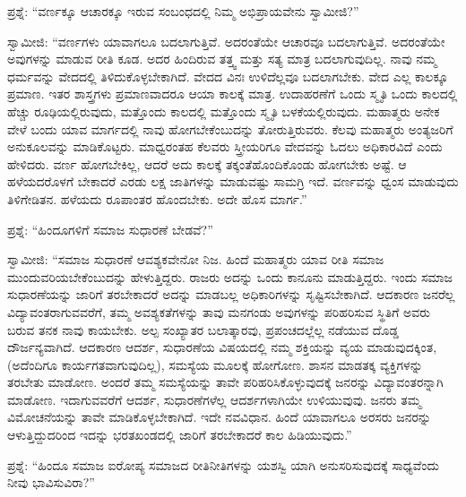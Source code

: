  ಪ್ರಶ್ನೆ: “ವರ್ಣಕ್ಕೂ ಆಚಾರಕ್ಕೂ ಇರುವ ಸಂಬಂಧದಲ್ಲಿ ನಿಮ್ಮ ಅಭಿಪ್ರಾಯವೇನು ಸ್ವಾಮೀಜಿ?” 

 ಸ್ವಾಮೀಜಿ: “ವರ್ಣಗಳು ಯಾವಾಗಲೂ ಬದಲಾಗುತ್ತಿವೆ. ಅದರಂತೆಯೇ ಆಚಾರವೂ ಬದಲಾಗುತ್ತಿವೆ. ಅದರಂತೆಯೇ ಅವುಗಳನ್ನು ಮಾಡುವ ರೀತಿ ಕೂಡ. ಅದರ ಹಿಂದಿರುವ ತತ್ತ್ವ ಮತ್ತು ಸತ್ಯ ಮಾತ್ರ ಬದಲಾಗುವುದಿಲ್ಲ. ನಾವು ನಮ್ಮ ಧರ್ಮವನ್ನು ವೇದದಲ್ಲಿ ತಿಳಿದುಕೊಳ್ಳಬೇಕಾಗಿದೆ. ವೇದದ ವಿನಃ ಉಳಿದೆಲ್ಲವೂ ಬದಲಾಗಬೇಕು. ವೇದ ಎಲ್ಲ ಕಾಲಕ್ಕೂ ಪ್ರಮಾಣ. ಇತರ ಶಾಸ್ತ್ರಗಳು ಪ್ರಮಾಣವಾದರೂ ಆಯಾ ಕಾಲಕ್ಕೆ ಮಾತ್ರ. ಉದಾಹರಣೆಗೆ ಒಂದು ಸ್ಮೃತಿ ಒಂದು ಕಾಲದಲ್ಲಿ ಹೆಚ್ಚು ರೂಢಿಯಲ್ಲಿರುವುದು, ಮತ್ತೊಂದು ಕಾಲದಲ್ಲಿ ಮತ್ತೊಂದು ಸ್ಮೃತಿ ಬಳಕೆಯಲ್ಲಿರುವುದು. ಮಹಾತ್ಮರು ಅನೇಕ ವೇಳೆ ಬಂದು ಯಾವ ಮಾರ್ಗದಲ್ಲಿ ನಾವು ಹೋಗಬೇಕೆಂಬುದನ್ನು ತೋರುತ್ತಿರುವರು. ಕೆಲವು ಮಹಾತ್ಮರು ಅಂತ್ಯಜರಿಗೆ ಅನುಕೂಲವನ್ನು ಮಾಡಿಕೊಟ್ಟರು. ಮಾಧ್ವರಂತಹ ಕೆಲವರು ಸ್ತ್ರೀಯರಿಗೂ ವೇದವನ್ನು ಓದಲು ಅಧಿಕಾರವಿದೆ ಎಂದು ಹೇಳಿದರು. ವರ್ಣ ಹೋಗಬೇಕಿಲ್ಲ, ಆದರೆ ಅದು ಕಾಲಕ್ಕೆ ತಕ್ಕಂತೆ\break ಹೊಂದಿಕೊಂಡು ಹೋಗಬೇಕು ಅಷ್ಟೆ. ಆ ಹಳೆಯದರೊಳಗೆ ಬೇಕಾದರೆ ಎರಡು ಲಕ್ಷ ಜಾತಿಗಳನ್ನು ಮಾಡುವಷ್ಟು ಸಾಮಗ್ರಿ ಇದೆ. ವರ್ಣವನ್ನು ಧ್ವಂಸ ಮಾಡುವುದು ತಿಳಿಗೇಡಿತನ. ಹಳೆಯದು ರೂಪಾಂತರ ಹೊಂದಬೇಕು. ಅದೇ ಹೊಸ ಮಾರ್ಗ.” 

 ಪ್ರಶ್ನೆ: “ಹಿಂದೂಗಳಿಗೆ ಸಮಾಜ ಸುಧಾರಣೆ ಬೇಡವೆ?” 

 ಸ್ವಾಮೀಜಿ: “ಸಮಾಜ ಸುಧಾರಣೆ ಆವಶ್ಯಕವೇನೋ ನಿಜ. ಹಿಂದೆ ಮಹಾತ್ಮರು ಯಾವ ರೀತಿ ಸಮಾಜ ಮುಂದುವರಿಯಬೇಕೆಂಬುದನ್ನು ಹೇಳುತ್ತಿದ್ದರು. ರಾಜರು ಅದನ್ನು ಒಂದು ಕಾನೂನು ಮಾಡುತ್ತಿದ್ದರು. ಇಂದು ಸಮಾಜ ಸುಧಾರಣೆಯನ್ನು ಜಾರಿಗೆ ತರಬೇಕಾದರೆ ಅದನ್ನು ಮಾಡಬಲ್ಲ ಅಧಿಕಾರಿಗಳನ್ನು ಸೃಷ್ಟಿಸಬೇಕಾಗಿದೆ. ಆದಕಾರಣ ಜನರೆಲ್ಲ ವಿದ್ಯಾವಂತರಾಗುವವರೆಗೆ, ತಮ್ಮ ಅವಶ್ಯಕತೆಗಳನ್ನು ತಾವು ಮನಗಂಡು ಅವುಗಳನ್ನು ಪರಿಹರಿಸುವ ಸ್ಥಿತಿಗೆ ಅವರು ಬರುವ ತನಕ ನಾವು ಕಾಯಬೇಕು. ಅಲ್ಪ ಸಂಖ್ಯಾತರ ಬಲಾತ್ಕಾರವು, ಪ್ರಪಂಚದಲ್ಲೆಲ್ಲ ನಡೆಯುವ ದೊಡ್ಡ ದೌರ್ಜನ್ಯವಾಗಿದೆ. ಆದಕಾರಣ ಆದರ್ಶ, ಸುಧಾರಣೆಯ ವಿಷಯದಲ್ಲಿ ನಮ್ಮ ಶಕ್ತಿಯನ್ನು ವ್ಯಯ ಮಾಡುವುದಕ್ಕಿಂತ, (ಅದೆಂದಿಗೂ ಕಾರ್ಯಗತವಾಗುವುದಿಲ್ಲ), ಸಮಸ್ಯೆಯ ಮೂಲಕ್ಕೆ ಹೋಗೋಣ. ಶಾಸನ ಮಾಡತಕ್ಕ ವ್ಯಕ್ತಿಗಳನ್ನು ತರಬೇತು ಮಾಡೋಣ. ಅಂದರೆ ತಮ್ಮ ಸಮಸ್ಯೆಯನ್ನು ತಾವೇ ಪರಿಹರಿಸಿಕೊಳ್ಳುವುದಕ್ಕೆ ಜನರನ್ನು ವಿದ್ಯಾವಂತರನ್ನಾಗಿ ಮಾಡೋಣ. ಇದಾಗುವವರೆಗೆ ಆದರ್ಶ, ಸುಧಾರಣೆಗಳೆಲ್ಲ ಆದರ್ಶಗಳಾಗಿಯೇ ಉಳಿಯುವುವು. ಜನರು ತಮ್ಮ ವಿಮೋಚನೆಯನ್ನು ತಾವೇ ಮಾಡಿಕೊಳ್ಳಬೇಕಾಗಿದೆ. ಇದೇ ನವವಿಧಾನ. ಹಿಂದೆ ಯಾವಾಗಲೂ ಅರಸರು ಜನರನ್ನು ಆಳುತ್ತಿದ್ದುದರಿಂದ ಇದನ್ನು ಭರತಖಂಡದಲ್ಲಿ ಜಾರಿಗೆ ತರಬೇಕಾದರೆ ಕಾಲ ಹಿಡಿಯುವುದು.” 

 ಪ್ರಶ್ನೆ: “ಹಿಂದೂ ಸಮಾಜ ಐರೋಪ್ಯ ಸಮಾಜದ ರೀತಿನೀತಿಗಳನ್ನು ಯಶಸ್ವಿ ಯಾಗಿ ಅನುಸರಿಸುವುದಕ್ಕೆ ಸಾಧ್ಯವೆಂದು ನೀವು ಭಾವಿಸುವಿರಾ?” 

